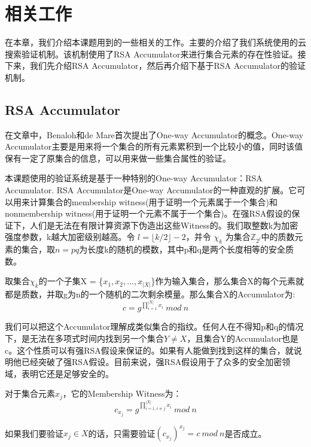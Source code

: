 \chapter{相关工作}
\label{chap:relatedwork}
在本章，我们介绍本课题用到的一些相关的工作。主要的介绍了我们系统使用的云搜索验证机制。该机制使用了RSA Accumulator\cite{goodrich2002efficient,verifiableindex}来进行集合元素的存在性验证。接下来，我们先介绍RSA Accumulator，然后再介绍下基于RSA Accumulator的验证机制。

\section{RSA Accumulator}
在文章\cite{benaloh1994one}中，Benaloh和de Mare首次提出了One-way Accumulator的概念。One-way Accumulator主要是用来将一个集合的所有元素累积到一个比较小的值，同时该值保有一定了原集合的信息，可以用来做一些集合属性的验证。

本课题使用的验证系统是基于一种特别的One-way Accumulator：RSA Accumulator\cite{goodrich2002efficient}.
RSA Accumulator是One-way Accumulator\cite{benaloh1994one}的一种直观的扩展。它可以用来计算集合的membership witness(用于证明一个元素属于一个集合)和nonmembership witness(用于证明一个元素不属于一个集合)。在强RSA假设的保证下\cite{baric1997collision}，人们是无法在有限计算资源下伪造出这些Witness的。我们取整数k为加密强度参数，k越大加密级别越高。令 $l = \lfloor k/2 \rfloor - 2$，并令 $\chi_k$ 为集合$\mathbb{Z}_{2^l}$中的质数元素的集合，取$n = pq$为长度k的随机的模数，其中p和q是两个长度相等的安全质数。

取集合$\chi_k$的一个子集X = \{$x_1, x_2, ... , x_{|X|}$\}作为输入集合，那么集合X的每个元素就都是质数，并取g为n的一个随机的二次剩余模量。那么集合X的Accumulator为:
\begin{equation} c = g^{\prod_{i = 1}^{|X|} x_i}\ mod\ n \end{equation}

我们可以把这个Accumulator理解成类似集合的指纹。任何人在不得知p和q的情况下，是无法在多项式时间内找到另一个集合$Y \neq X$，且集合Y的Accumulator也是c。这个性质可以有强RSA假设来保证的。如果有人能做到找到这样的集合，就说明他已经突破了强RSA假设。目前来说，强RSA假设用于了众多的安全加密领域，表明它还是足够安全的。

对于集合元素$x_j$，它的Membership Witness为：
\begin{equation} \label{eq:sw} c_{x_j} = g^{\prod_{i=1, i \ne j}^{|X|} x_i}\ mod\ n \end{equation}

如果我们要验证$x_j \in X$的话，只需要验证$(c_{x_j})^{x_j} = c\ mod\ n$是否成立。

